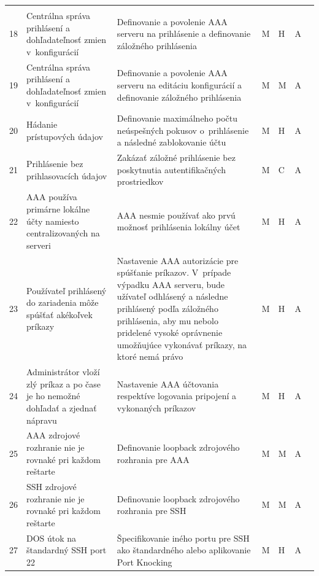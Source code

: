 \begin{longtable}[!htbp]{|C{2.5em}L{11em}L{11em}C{2.5em}C{4em}C{5em}L{2.5em}|}
	\cite{CIS_DrTLsgXv24lxeIIM}	\\
	18	&Centrálna správa prihlásení a dohľadateľnosť zmien v~konfigurácií	&Definovanie a povolenie AAA serveru na prihlásenie a definovanie záložného prihlásenia	&M	&H	&A	& \cite{Akin2002}
	
	\cite{CIS_DrTLsgXv24lxeIIM} 
	
	\cite{McMillan2018}
	
	\cite{Graesser2001}	\\
	 19	&Centrálna správa prihlásení a dohľadateľnosť zmien v~konfigurácií	&Definovanie a povolenie AAA serveru na editáciu konfigurácií a definovanie záložného prihlásenia	&M	&M	&A	& \cite{CIS_DrTLsgXv24lxeIIM}
	
	\cite{Graesser2001}	\\
	20	&Hádanie prístupových údajov	&Definovanie maximálneho počtu neúspešných pokusov o~prihlásenie a následné zablokovanie účtu	&M	&H	&A	& \cite{CIS_DrTLsgXv24lxeIIM}
	
	\cite{Graesser2001}	\\
	 21	&Prihlásenie bez prihlasovacích údajov	&Zakázať záložné prihlásenie bez poskytnutia autentifikačných prostriedkov	&M	&C	&A	& \cite{Singh2018}	\\
	22	&AAA používa primárne lokálne účty namiesto centralizovaných na serveri	&AAA nesmie používať ako prvú možnosť prihlásenia lokálny účet 	&M	&H	&A	& \cite{CIS_DrTLsgXv24lxeIIM}
	
	\cite{Graesser2001}	\\
	 23	&Používateľ prihlásený do zariadenia môže spúšťať akékoľvek príkazy	&Nastavenie AAA autorizácie pre spúšťanie príkazov. V~prípade výpadku AAA serveru, bude užívateľ odhlásený a následne prihlásený podľa  záložného prihlásenia, aby mu nebolo pridelené vysoké oprávnenie umožňujúce vykonávať príkazy, na ktoré nemá právo	&M	&H	&A	& \cite{Graesser2001}
	
	\cite{Singh2018}	\\
	24	&Administrátor vloží zlý príkaz a po čase je ho nemožné dohľadať a zjednať nápravu	&Nastavenie AAA účtovania respektíve logovania pripojení a vykonaných príkazov	&M	&H	&A	& \cite{CIS_DrTLsgXv24lxeIIM}	\\
	 25	&AAA zdrojové rozhranie nie je rovnaké pri každom reštarte	&Definovanie loopback zdrojového rozhrania pre AAA	&M	&M	&A	& \cite{CIS_DrTLsgXv24lxeIIM}	\\
	26	&SSH zdrojové rozhranie nie je rovnaké pri každom reštarte	& Definovanie loopback zdrojového rozhrania pre SSH	&M	&M	&A	& \cite{CIS_DrTLsgXv24lxeIIM}	\\
	 27	&DOS útok na štandardný SSH port 22	&Špecifikovanie iného portu pre SSH ako štandardného alebo aplikovanie Port Knocking \cite{MJVmQiKUgZl92S8u}	&M	&H	&A	& \cite{MJVmQiKUgZl92S8u}	\\
	\hline
	
	
\end{longtable}%


